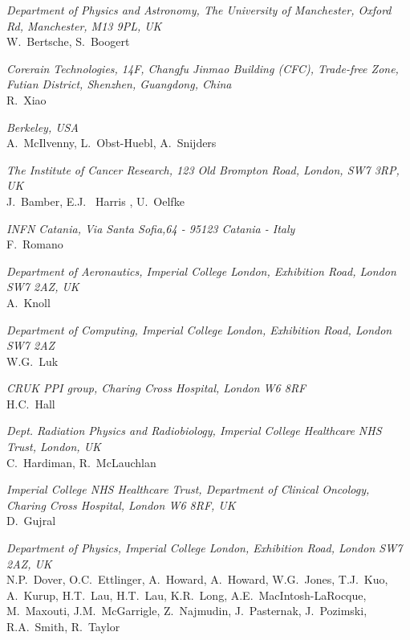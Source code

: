 \vspace{0.5cm}
\noindent \textit{Department of Physics and Astronomy, The University of Manchester, Oxford Rd, Manchester, M13 9PL, UK} \\
W.~Bertsche, S.~Boogert
 
\vspace{0.5cm}
\noindent \textit{Corerain Technologies, 14F, Changfu Jinmao Building (CFC), Trade-free Zone, Futian District, Shenzhen, Guangdong, China} \\
R.~Xiao
 
\vspace{0.5cm}
\noindent \textit{Berkeley, USA} \\
A.~McIlvenny, L.~Obst-Huebl, A.~Snijders
 
\vspace{0.5cm}
\noindent \textit{The Institute of Cancer Research, 123 Old Brompton Road, London, SW7 3RP, UK} \\
J.~Bamber, E.J. ~Harris , U.~Oelfke
 
\vspace{0.5cm}
\noindent \textit{INFN Catania, Via Santa Sofia,64 - 95123 Catania - Italy} \\
F.~Romano
 
\vspace{0.5cm}
\noindent \textit{Department of Aeronautics, Imperial College London, Exhibition Road, London SW7 2AZ, UK} \\
A.~Knoll
 
\vspace{0.5cm}
\noindent \textit{Department of Computing, Imperial College London, Exhibition Road, London SW7 2AZ} \\
W.G.~Luk
 
\vspace{0.5cm}
\noindent \textit{CRUK PPI group, Charing Cross Hospital, London W6 8RF} \\
H.C.~Hall
 
\vspace{0.5cm}
\noindent \textit{Dept. Radiation Physics and Radiobiology, Imperial College Healthcare NHS Trust, London, UK} \\
C.~Hardiman, R.~McLauchlan
 
\vspace{0.5cm}
\noindent \textit{Imperial College NHS Healthcare Trust, Department of Clinical Oncology, Charing Cross Hospital, London W6 8RF, UK} \\
D.~Gujral
 
\vspace{0.5cm}
\noindent \textit{Department of Physics, Imperial College London, Exhibition Road, London SW7 2AZ, UK} \\
N.P.~Dover, O.C.~Ettlinger, A.~Howard, A.~Howard, W.G.~Jones, T.J.~Kuo, A.~Kurup, H.T.~Lau, H.T.~Lau, K.R.~Long, A.E.~MacIntosh-LaRocque, M.~Maxouti, J.M.~McGarrigle, Z.~Najmudin, J.~Pasternak, J.~Pozimski, R.A.~Smith, R.~Taylor
 
